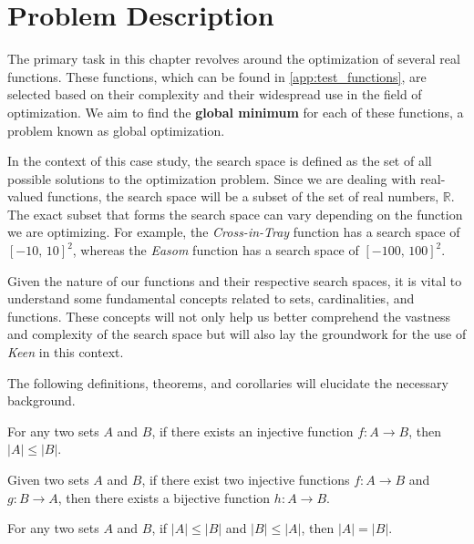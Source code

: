 \section{Problem Description}
\label{sec:fn_opt:problem}
    The primary task in this chapter revolves around the optimization of several real functions. These functions, which 
    can be found in \vref{app:test_functions}, are selected based on their complexity and their widespread use in the 
    field of optimization. We aim to find the \textbf{global minimum} for each of these functions, a problem known as 
    global optimization.

    In the context of this case study, the search space is defined as the set of all possible solutions to the 
    optimization problem. Since we are dealing with real-valued functions, the search space will be a subset of the set 
    of real numbers, \(\mathbb{R}\). The exact subset that forms the search space can vary depending on the function we 
    are optimizing. For example, the \textit{Cross-in-Tray} function has a search space of \([-10,\,10]^2\), whereas the 
    \textit{Easom} function has a search space of \([-100,\,100]^2\).
    
    Given the nature of our functions and their respective search spaces, it is vital to understand some fundamental 
    concepts related to sets, cardinalities, and functions. These concepts will not only help us better comprehend the 
    vastness and complexity of the search space but will also lay the groundwork for the use of \textit{Keen} in this 
    context.
    
    The following definitions, theorems, and corollaries will elucidate the necessary background.

    \begin{definition}
    \label{def:fn_opt:cardinality_inequality}
        For any two sets \(A\) and \(B\), if there exists an injective function \(f : A \to B\), then \(|A| \leq |B|\).
    \end{definition}

    \begin{theorem}
    \label{thm:fn_opt:schroder_bernstein}
        Given two sets \(A\) and \(B\), if there exist two injective functions \(f : A \to B\) and \(g : B \to A\), then 
        there exists a bijective function \(h : A \to B\).
    \end{theorem}

    \begin{corollary}
    \label{cor:fn_opt:cardinality}
        For any two sets \(A\) and \(B\), if \(|A| \leq |B|\) and \(|B| \leq |A|\), then \(|A| = |B|\).
    \end{corollary}

